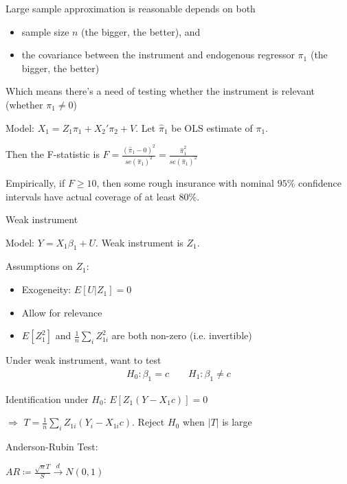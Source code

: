 \documentclass[10pt,landscape]{article}
\makeatletter
\numberwithin{equation}{section}
\renewcommand{\subsection}{\@startsection{subsection}{2}{0mm}
                           {-1explus -.5ex minus -.2ex}
                           {0.5ex plus .2ex}{\normalfont\normalsize\bfseries}}
\theoremstyle{definition}
\newcommand\abs[1]{\left| #1 \right|}
\newcommand{\then}{$\Rightarrow$ }
\newcommand{\1}{\mathbbm 1}
\makeatother
\begin{document}
\begin{multicols}{3}
Large sample approximation is reasonable depends on both 
\begin{itemize}
  \item sample size $n$ (the bigger, the better), and
  \item the covariance between the instrument and endogenous regressor $\pi_1$ (the bigger, the better)
\end{itemize}

Which means there's a need of testing whether the instrument is relevant (whether $\pi_1 \neq 0$)

\begin{adjustwidth}{.3cm}{0cm}
  Model: $X_1 = Z_1 \pi_1 + X_2' \pi_2 + V$. Let $\hat{\pi}_1$ be OLS estimate of $\pi_1$. 

  Then the F-statistic is $F = \frac{(\hat{\pi}_1 - 0)^2}{se({\hat{\pi}_1})^2} = \frac{\hat{\pi}_1^2}{se({\hat{\pi}_1})^2}$

  Empirically, if $F \geq 10$, then some rough insurance with nominal $95\%$ conﬁdence intervals have actual coverage of at least $80\%$.
\end{adjustwidth}

\subsection{Weak instrument}

Model: $Y = X_1 \beta_1 + U$. Weak instrument is $Z_1$. 

Assumptions on $Z_1$: 
\begin{itemize}
  \item Exogeneity: $E[U|Z_1] = 0$
  \item Allow for relevance
  \item $E[Z_1^2]$ and $\frac{1}{n} \sum_i Z_{1i}^2$ are both non-zero (i.e. invertible)
\end{itemize}

Under weak instrument, want to test
\begin{align*}
  H_0 : \beta_1 = c \quad \quad H_1 : \beta_1 \neq c
\end{align*}

Identification under $H_0$: $E[Z_1(Y - X_1 c)] = 0$

\then $T = \frac{1}{n} \sum_i Z_{1i} (Y_i - X_{1i}c)$. Reject $H_0$ when $\abs{T}$ is large

Anderson-Rubin Test: 

\begin{adjustwidth}{.3cm}{0cm}
$AR \coloneqq \frac{\sqrt{n}T}{S} \xrightarrow{d} N(0, 1)$


\end{adjustwidth}
\end{multicols}
\end{document}
